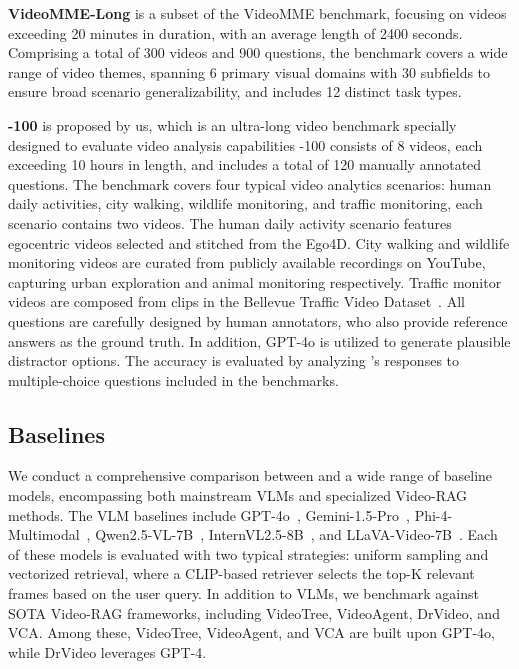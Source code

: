 \textbf{VideoMME-Long}\cite{fu2024videomme} is a subset of the VideoMME benchmark, focusing on videos exceeding 20 minutes in duration, with an average length of 2400 seconds. Comprising a total of 300 videos and 900 questions, the benchmark covers a wide range of video themes, spanning 6 primary visual domains with 30 subfields to ensure broad scenario generalizability, and includes 12 distinct task types.

\textbf{\sysname{}-100} is proposed by us, which is an ultra-long video benchmark specially designed to evaluate video analysis capabilities
\sysname{}-100 consists of 8 videos, each exceeding 10 hours in length, and includes a total of 120 manually annotated questions. The benchmark
covers four typical video analytics scenarios: human daily activities, city walking, wildlife monitoring, and traffic monitoring, each scenario contains two videos. The human daily activity scenario features egocentric videos selected and stitched from the Ego4D\cite{grauman2022ego4d}. City walking and wildlife monitoring videos are curated from publicly available recordings on YouTube, capturing urban exploration and animal monitoring respectively. Traffic monitor videos are composed from clips in the Bellevue Traffic Video Dataset~\cite{bhardwaj2022ekya}. All questions are carefully designed by human annotators, who also provide reference answers as the ground truth. In addition, GPT-4o is utilized to generate plausible distractor options. The accuracy is evaluated by analyzing \sysname's responses to multiple-choice questions included in the benchmarks. 



\subsection{Baselines}
We conduct a comprehensive comparison between \sysname{} and a wide range of baseline models, encompassing both mainstream VLMs and specialized Video-RAG methods. The VLM baselines include GPT-4o~\cite{achiam2023gpt}, Gemini-1.5-Pro~\cite{team2023gemini}, Phi-4-Multimodal~\cite{abdin2024phi4}, Qwen2.5-VL-7B~\cite{bai2025qwen2_5}, InternVL2.5-8B~\cite{chen2024internvl}, and LLaVA-Video-7B~\cite{zhang2024llavavideo}. Each of these models is evaluated with two typical strategies: uniform sampling and vectorized retrieval, where a CLIP-based retriever selects the top-K relevant frames based on the user query. In addition to VLMs, we benchmark \sysname{} against SOTA Video-RAG frameworks, including VideoTree\cite{wang2024videotree}, VideoAgent\cite{wang2024videoagent}, DrVideo\cite{ma2024drvideo}, and VCA\cite{yang2024vca}. Among these, VideoTree, VideoAgent, and VCA are built upon GPT-4o, while DrVideo leverages GPT-4.

